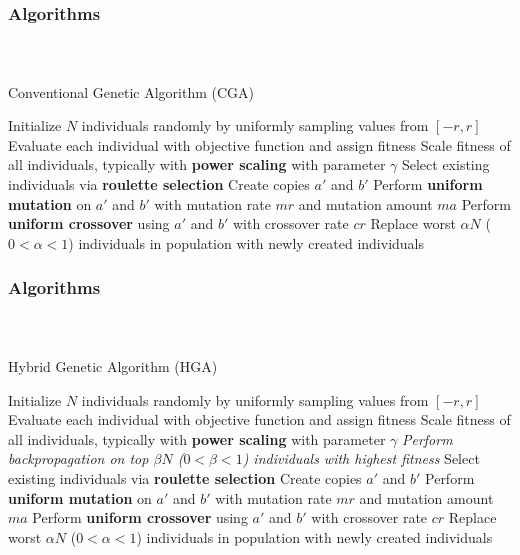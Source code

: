 \begin{frame}[t]
	\frametitle{Algorithms}
	\framesubtitle{~~}  %

\begin{algorithm}[h]
\small
\caption{Conventional Genetic Algorithm (CGA)}
\label{alg:genetic}
\begin{algorithmic}
\STATE Initialize $N$ individuals randomly by uniformly sampling values from $[-r, r]$
  \STATE Evaluate each individual with objective function and assign fitness
  \STATE Scale fitness of all individuals, typically with \textbf{power scaling} with parameter $\gamma$
  \STATE Select existing individuals via \textbf{roulette selection}
    \STATE Create copies $a'$ and $b'$
    \STATE Perform \textbf{uniform mutation} on $a'$ and $b'$ with mutation rate $mr$ and mutation amount $ma$
    \STATE Perform \textbf{uniform crossover} using $a'$ and $b'$ with crossover rate $cr$
  \ENDFOR
  \STATE Replace worst $\alpha N$ ($0< \alpha < 1$) individuals in population with newly created individuals
\ENDFOR
\end{algorithmic}
\end{algorithm}

\end{frame}


\begin{frame}[t]
	\frametitle{Algorithms}
	\framesubtitle{~~}  %

\begin{algorithm}[H]
\small
\caption{Hybrid Genetic Algorithm (HGA)}
\label{alg:hga}
\begin{algorithmic}
\STATE Initialize $N$ individuals randomly by uniformly sampling values from $[-r, r]$
  \STATE Evaluate each individual with objective function and assign fitness
  \STATE Scale fitness of all individuals, typically with \textbf{power scaling} with parameter $\gamma$
  \STATE \textit{Perform backpropagation on top $\beta N$ ($0 < \beta < 1$) individuals with highest fitness}
  \STATE Select existing individuals via \textbf{roulette selection}
    \STATE Create copies $a'$ and $b'$
    \STATE Perform \textbf{uniform mutation} on $a'$ and $b'$ with mutation rate $mr$ and mutation amount $ma$
    \STATE Perform \textbf{uniform crossover} using $a'$ and $b'$ with crossover rate $cr$
  \ENDFOR
  \STATE Replace worst $\alpha N$ ($0< \alpha < 1$) individuals in population with newly created individuals
\ENDFOR
\end{algorithmic}
\end{algorithm}

\end{frame}


